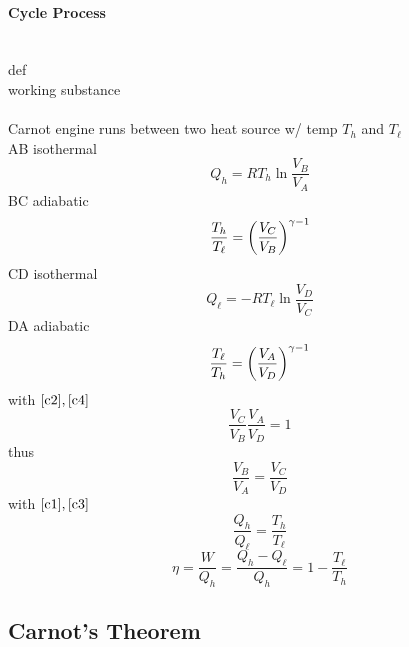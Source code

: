 \documentclass[UTF8]{ctexart} %
\newcommand{\txra}{\textrightarrow}
\numberwithin{equation}{subsection}
\begin{document}
\paragraph{Cycle Process}~\\
def\\
working substance\\
~\\
Carnot engine runs between two heat source w/ temp $T_h$ and $T_\ell$\\
A\txra B  isothermal
\begin{equation}\label{c1}
Q_h = RT_h\ln\dfrac{V_B}{V_A}
\end{equation}
B\txra C  adiabatic
\begin{equation}\label{c2}
\dfrac{T_h}{T_\ell}  =  \qty(\dfrac{V_C}{V_B})^{\gamma-1}
\end{equation}
C\txra D  isothermal
\begin{equation}\label{c3}
Q_\ell = -RT_\ell \ln\dfrac{V_D}{V_C}
\end{equation}
D\txra A  adiabatic
\begin{equation}\label{c4}
\dfrac{T_\ell}{T_h}  =  \qty(\dfrac{V_A}{V_D})^{\gamma-1}
\end{equation}
with $\eqref{c2},\eqref{c4}$
\begin{equation}\label{key}
\dfrac{V_C}{V_B}\dfrac{V_A}{V_D} = 1
\end{equation}
thus
\begin{equation}\label{key}
\dfrac{V_B}{V_A} = \dfrac{V_C}{V_D}
\end{equation}
with $\eqref{c1},\eqref{c3}$
\begin{equation}\label{key}
\dfrac{Q_h}{Q_\ell} = \dfrac{T_h}{T_\ell}
\end{equation}
\begin{equation}\label{key}
\eta = \dfrac{W}{Q_h} = \dfrac{Q_h - Q_\ell}{Q_h} = 1 - \dfrac{T_\ell}{T_h}
\end{equation}

\subsection{Carnot's Theorem}
\subsection{}
\end{document}
